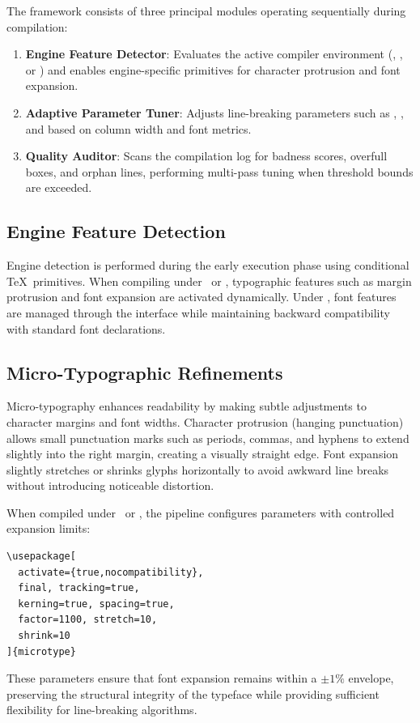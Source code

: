 \documentclass{ltugboat}
\begin{document}
The  framework consists of three principal modules operating sequentially during compilation:
\begin{enumerate}
\item \textbf{Engine Feature Detector}: Evaluates the active compiler environment (\pdfTeX, \LuaTeX, or \XeTeX) and enables engine-specific primitives for character protrusion and font expansion.
\item \textbf{Adaptive Parameter Tuner}: Adjusts line-breaking parameters such as , , and  based on column width and font metrics.
\item \textbf{Quality Auditor}: Scans the compilation log for badness scores, overfull boxes, and orphan lines, performing multi-pass tuning when threshold bounds are exceeded.
\end{enumerate}

\subsection{Engine Feature Detection}

Engine detection is performed during the early execution phase using conditional \TeX\ primitives. When compiling under \pdfTeX\ or \LuaTeX, typographic features such as margin protrusion and font expansion are activated dynamically. Under \XeTeX, font features are managed through the  interface while maintaining backward compatibility with standard font declarations.

\subsection{Micro-Typographic Refinements}

Micro-typography enhances readability by making subtle adjustments to character margins and font widths. Character protrusion (hanging punctuation) allows small punctuation marks such as periods, commas, and hyphens to extend slightly into the right margin, creating a visually straight edge. Font expansion slightly stretches or shrinks glyphs horizontally to avoid awkward line breaks without introducing noticeable distortion.

When compiled under \pdfTeX\ or \LuaTeX, the  pipeline configures parameters with controlled expansion limits:
\begin{small}
\begin{verbatim}
\usepackage[
  activate={true,nocompatibility},
  final, tracking=true,
  kerning=true, spacing=true,
  factor=1100, stretch=10,
  shrink=10
]{microtype}
\end{verbatim}
\end{small}
These parameters ensure that font expansion remains within a $\pm 1\%$ envelope, preserving the structural integrity of the typeface while providing sufficient flexibility for line-breaking algorithms.
\end{document}
